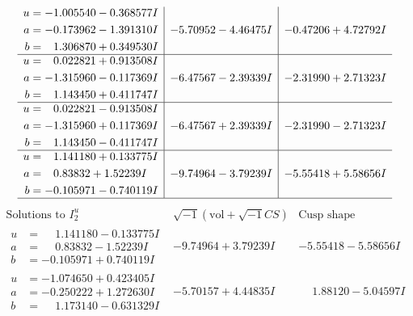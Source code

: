 \documentclass[1p]{elsarticle_modified}
\theoremstyle{definition}
\newcommand{\I}{\sqrt{-1}}
\begin{document}
$$\begin{array}{c|c|c}
\begin{aligned}
u &= -1.005540 - 0.368577 I \\
a &= -0.173962 - 1.391310 I \\
b &= \phantom{-}1.306870 + 0.349530 I\end{aligned}
 & -5.70952 - 4.46475 I & -0.47206 + 4.72792 I \\ \hline\begin{aligned}
u &= \phantom{-}0.022821 + 0.913508 I \\
a &= -1.315960 - 0.117369 I \\
b &= \phantom{-}1.143450 + 0.411747 I\end{aligned}
 & -6.47567 - 2.39339 I & -2.31990 + 2.71323 I \\ \hline\begin{aligned}
u &= \phantom{-}0.022821 - 0.913508 I \\
a &= -1.315960 + 0.117369 I \\
b &= \phantom{-}1.143450 - 0.411747 I\end{aligned}
 & -6.47567 + 2.39339 I & -2.31990 - 2.71323 I \\ \hline\begin{aligned}
u &= \phantom{-}1.141180 + 0.133775 I \\
a &= \phantom{-}0.83832 + 1.52239 I \\
b &= -0.105971 - 0.740119 I\end{aligned}
 & -9.74964 - 3.79239 I & -5.55418 + 5.58656 I\\
 \hline 
 \end{array}$$\newpage$$\begin{array}{c|c|c}  
\text{Solutions to }I^u_{2}& \I (\text{vol} + \sqrt{-1}CS) & \text{Cusp shape}\\
 \hline 
\begin{aligned}
u &= \phantom{-}1.141180 - 0.133775 I \\
a &= \phantom{-}0.83832 - 1.52239 I \\
b &= -0.105971 + 0.740119 I\end{aligned}
 & -9.74964 + 3.79239 I & -5.55418 - 5.58656 I \\ \hline\begin{aligned}
u &= -1.074650 + 0.423405 I \\
a &= -0.250222 + 1.272630 I \\
b &= \phantom{-}1.173140 - 0.631329 I\end{aligned}
 & -5.70157 + 4.44835 I & \phantom{-}1.88120 - 5.04597 I \\ \hline\begin{aligned}

\end{aligned}
\end{array}$$
\end{document}
